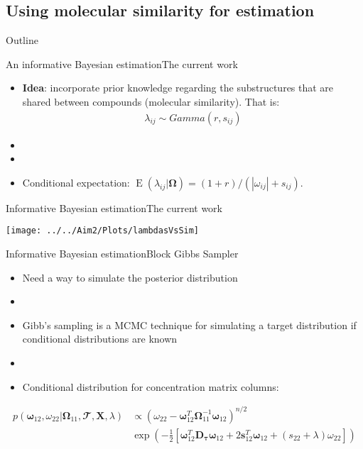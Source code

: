 \documentclass[xcolor=dvipsnames]{beamer}
\DeclareMathOperator{\EE}{E}
\begin{document}
\subsection{Using molecular similarity for estimation}
\begin{frame}{Outline}
	\vspace{-10.5pt}
	\tableofcontents[currentsection,subsectionstyle=show/shaded/hide]
\end{frame}
\begin{frame}{An informative Bayesian estimation}{The current work}
	\vspace{-15.5pt}
	\begin{itemize}
		\item \textbf{Idea}:  incorporate prior knowledge regarding the substructures that are shared between compounds (molecular similarity). That is:
		\begin{align*}
			\lambda_{ij}\sim Gamma(r,s_{ij})
		\end{align*}\pause
		\item[]
		\item[]
		\item Conditional expectation: $\EE(\lambda_{ij}|\boldsymbol{\Omega})=(1+r)/(|\omega_{ij} |+s_{ij})$.
	\end{itemize}
\end{frame}

\begin{frame}{Informative Bayesian estimation}{The current work}
	\begin{center}
			\texttt{[image: ../../Aim2/Plots/lambdasVsSim]}
	\end{center}
\end{frame}

\begin{frame}{Informative Bayesian estimation}{Block Gibbs Sampler}
	\vspace{-10.5pt}
	\begin{itemize}
		\item Need a way to simulate the posterior distribution \pause
		\item[]
		\item Gibb's sampling is a MCMC technique for simulating a target distribution if conditional distributions are known \pause
		\item[]
		\item Conditional distribution for concentration matrix columns:
	\end{itemize}
	\begin{align*}
	p(\boldsymbol{\omega}_{12}, \omega_{22}|\boldsymbol{\Omega}_{11},\mathbfcal{T},\textbf{X},\lambda) & \propto \left(\omega_{22}-\boldsymbol{\omega}_{12}^T \boldsymbol{\Omega}_{11}^{-1}\boldsymbol{\omega}_{12} \right)^{n/2} \\ &\exp \left( - \frac{1}{2}\left[ \boldsymbol{\omega}_{12}^T \textbf{D}_{\boldsymbol{\tau}} \boldsymbol{\omega}_{12}+ 2 
	\textbf{s}_{12}^T \boldsymbol{\omega}_{12} + (s_{22}+\lambda)\omega_{22}\right] \right)
	\end{align*}
\end{frame}
\end{document}
